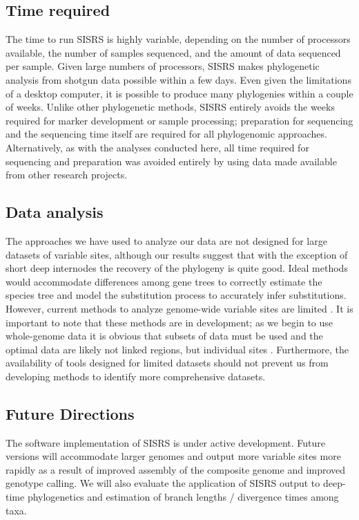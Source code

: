 \documentclass[11pt, oneside]{article}   	%
\begin{document}
\subsection{Time required}

The time to run SISRS is highly variable, depending on the number of processors available, the number of samples sequenced, and the amount of data sequenced per sample.
Given large numbers of processors, SISRS makes phylogenetic analysis from shotgun data possible within a few days.
Even given the limitations of a desktop computer, it is possible to produce many phylogenies within a couple of weeks.
Unlike other phylogenetic methods, SISRS entirely avoids the weeks required for marker development or sample processing; preparation for sequencing and the sequencing time itself are required for all phylogenomic approaches.
Alternatively, as with the analyses conducted here, all time required for sequencing and preparation was avoided entirely by using data made available from other research projects. 

\subsection{Data analysis}

The approaches we have used to analyze our data are not designed for large datasets of variable sites, although our results suggest that with the exception of short deep internodes the recovery of the phylogeny is quite good.
Ideal methods would accommodate differences among gene trees to correctly estimate the species tree and model the substitution process to accurately infer substitutions. 
However, current methods to analyze genome-wide variable sites are limited \citep[e.g.][]{Bryant2012}.
It is important to note that these methods are in development; as we begin to use whole-genome data it is obvious that subsets of data must be used and the optimal data are likely not linked regions, but individual sites \citep[e.g.][]{Yoder2013}.
Furthermore, the availability of tools designed for limited datasets should not prevent us from developing methods to identify more comprehensive datasets. 

\subsection{Future Directions}

The software implementation of SISRS is under active development. 
Future versions will accommodate larger genomes and output more variable sites more rapidly as a result of improved assembly of the composite genome and improved genotype calling.
We will also evaluate the application of SISRS output to deep-time phylogenetics and estimation of branch lengths / divergence times among taxa.
\end{document}
